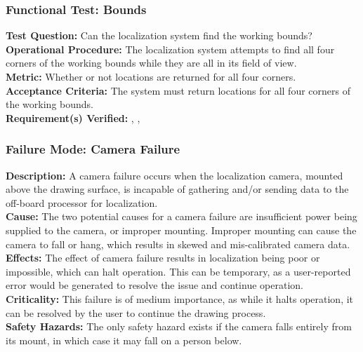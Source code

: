 \subsubsection{Functional Test: Bounds}
\label{test:localization_ft_bounds}
\textbf{Test Question:} Can the localization system find the working bounds?\\
\textbf{Operational Procedure:} The localization system attempts to find all four corners of the working bounds while they are all in its field of view.\\
\textbf{Metric:} Whether or not locations are returned for all four corners.\\
\textbf{Acceptance Criteria:} The system must return locations for all four corners of the working bounds.\\
\textbf{Requirement(s) Verified:} , , 

\subsubsection{Failure Mode: Camera Failure}
\label{sec:localization_fm_cam}
\textbf{Description:} A camera failure occurs when the localization camera, mounted above the drawing surface, is incapable of gathering and/or sending data to the off-board processor for localization.\\
\textbf{Cause:} The two potential causes for a camera failure are insufficient power being supplied to the camera, or improper mounting. Improper mounting can cause the camera to fall or hang, which results in skewed and mis-calibrated camera data.\\
\textbf{Effects:}  The effect of camera failure results in localization being poor or impossible, which can halt operation. This can be temporary, as a user-reported error would be generated to resolve the issue and continue operation.\\
\textbf{Criticality:}  This failure is of medium importance, as while it halts operation, it can be resolved by the user to continue the drawing process.\\
\textbf{Safety Hazards:} The only safety hazard exists if the camera falls entirely from its mount, in which case it may fall on a person below. 

